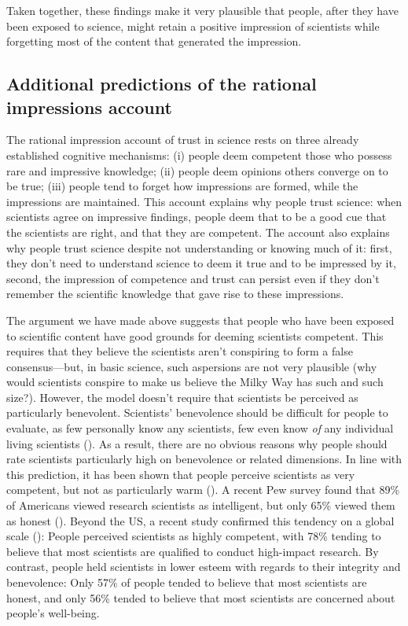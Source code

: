 \documentclass[
  man,
  floatsintext,
  longtable,
  nolmodern,
  notxfonts,
  notimes,
  colorlinks=true,linkcolor=blue,citecolor=blue,urlcolor=blue]{apa7}
\begin{document}
Taken together, these findings make it very plausible that people, after
they have been exposed to science, might retain a positive impression of
scientists while forgetting most of the content that generated the
impression.

\subsection{Additional predictions of the rational impressions
account}\label{additional-predictions-of-the-rational-impressions-account}

The rational impression account of trust in science rests on three
already established cognitive mechanisms: (i) people deem competent
those who possess rare and impressive knowledge; (ii) people deem
opinions others converge on to be true; (iii) people tend to forget how
impressions are formed, while the impressions are maintained. This
account explains why people trust science: when scientists agree on
impressive findings, people deem that to be a good cue that the
scientists are right, and that they are competent. The account also
explains why people trust science despite not understanding or knowing
much of it: first, they don't need to understand science to deem it true
and to be impressed by it, second, the impression of competence and
trust can persist even if they don't remember the scientific knowledge
that gave rise to these impressions.

The argument we have made above suggests that people who have been
exposed to scientific content have good grounds for deeming scientists
competent. This requires that they believe the scientists aren't
conspiring to form a false consensus---but, in basic science, such
aspersions are not very plausible (why would scientists conspire to make
us believe the Milky Way has such and such size?). However, the model
doesn't require that scientists be perceived as particularly benevolent.
Scientists' benevolence should be difficult for people to evaluate, as
few personally know any scientists, few even know \emph{of} any
individual living scientists
(). As a result, there are no obvious reasons why people should rate
scientists particularly high on benevolence or related dimensions. In
line with this prediction, it has been shown that people perceive
scientists as very competent, but not as particularly warm
(). A
recent Pew survey found that 89\% of Americans viewed research
scientists as intelligent, but only 65\% viewed them as honest
(). Beyond the US, a recent study confirmed this tendency on a
global scale (): People perceived scientists as highly competent, with 78\%
tending to believe that most scientists are qualified to conduct
high-impact research. By contrast, people held scientists in lower
esteem with regards to their integrity and benevolence: Only 57\% of
people tended to believe that most scientists are honest, and only 56\%
tended to believe that most scientists are concerned about people's
well-being.
\end{document}
